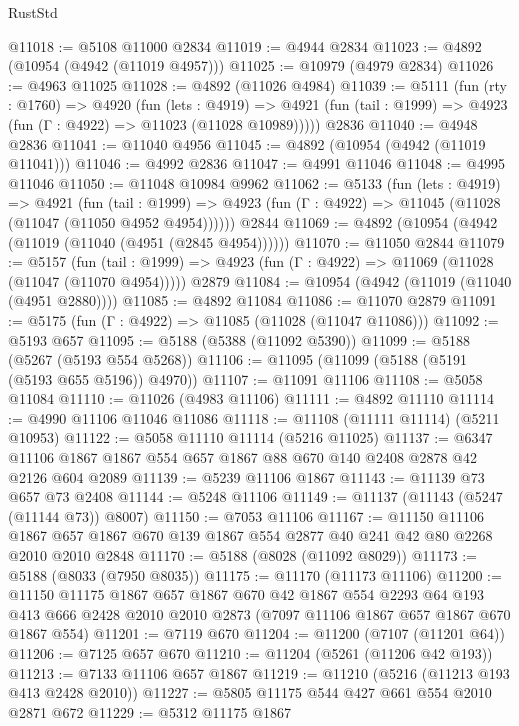 \begin{lexlean}{RustStd}
\begin{coremodule}
@11018 := @5108 @11000 @2834
@11019 := @4944 @2834
@11023 := @4892 (@10954 (@4942 (@11019 @4957)))
@11025 := @10979 (@4979 @2834)
@11026 := @4963 @11025
@11028 := @4892 (@11026 @4984)
@11039 := @5111
    (fun (rty : @1760) =>
    @4920
      (fun (lets : @4919) =>
      @4921 (fun (tail : @1999) => @4923 (fun (Γ : @4922) => @11023 (@11028 @10989)))))
    @2836
@11040 := @4948 @2836
@11041 := @11040 @4956
@11045 := @4892 (@10954 (@4942 (@11019 @11041)))
@11046 := @4992 @2836
@11047 := @4991 @11046
@11048 := @4995 @11046
@11050 := @11048 @10984 @9962
@11062 := @5133
    (fun (lets : @4919) =>
    @4921
      (fun (tail : @1999) =>
      @4923 (fun (Γ : @4922) => @11045 (@11028 (@11047 (@11050 @4952 @4954))))))
    @2844
@11069 := @4892 (@10954 (@4942 (@11019 (@11040 (@4951 (@2845 @4954))))))
@11070 := @11050 @2844
@11079 := @5157
    (fun (tail : @1999) => @4923 (fun (Γ : @4922) => @11069 (@11028 (@11047 (@11070 @4954)))))
    @2879
@11084 := @10954 (@4942 (@11019 (@11040 (@4951 @2880))))
@11085 := @4892 @11084
@11086 := @11070 @2879
@11091 := @5175 (fun (Γ : @4922) => @11085 (@11028 (@11047 @11086)))
@11092 := @5193 @657
@11095 := @5188 (@5388 (@11092 @5390))
@11099 := @5188 (@5267 (@5193 @554 @5268))
@11106 := @11095 (@11099 (@5188 (@5191 (@5193 @655 @5196)) @4970))
@11107 := @11091 @11106
@11108 := @5058 @11084
@11110 := @11026 (@4983 @11106)
@11111 := @4892 @11110
@11114 := @4990 @11106 @11046 @11086
@11118 := @11108 (@11111 @11114) (@5211 @10953)
@11122 := @5058 @11110 @11114 (@5216 @11025)
@11137 := @6347 @11106 @1867 @1867 @554 @657 @1867 @88 @670 @140 @2408 @2878 @42 @2126 @604 @2089
@11139 := @5239 @11106 @1867
@11143 := @11139 @73 @657 @73 @2408
@11144 := @5248 @11106
@11149 := @11137 (@11143 (@5247 (@11144 @73)) @8007)
@11150 := @7053 @11106
@11167 := @11150
    @11106
    @1867
    @657
    @1867
    @670
    @139
    @1867
    @554
    @2877
    @40
    @241
    @42
    @80
    @2268
    @2010
    @2010
    @2848
@11170 := @5188 (@8028 (@11092 @8029))
@11173 := @5188 (@8033 (@7950 @8035))
@11175 := @11170 (@11173 @11106)
@11200 := @11150
    @11175
    @1867
    @657
    @1867
    @670
    @42
    @1867
    @554
    @2293
    @64
    @193
    @413
    @666
    @2428
    @2010
    @2010
    @2873
    (@7097 @11106 @1867 @657 @1867 @670 @1867 @554)
@11201 := @7119 @670
@11204 := @11200 (@7107 (@11201 @64))
@11206 := @7125 @657 @670
@11210 := @11204 (@5261 (@11206 @42 @193))
@11213 := @7133 @11106 @657 @1867
@11219 := @11210 (@5216 (@11213 @193 @413 @2428 @2010))
@11227 := @5805 @11175 @544 @427 @661 @554 @2010 @2871 @672
@11229 := @5312 @11175 @1867

\end{coremodule}
\end{lexlean}
